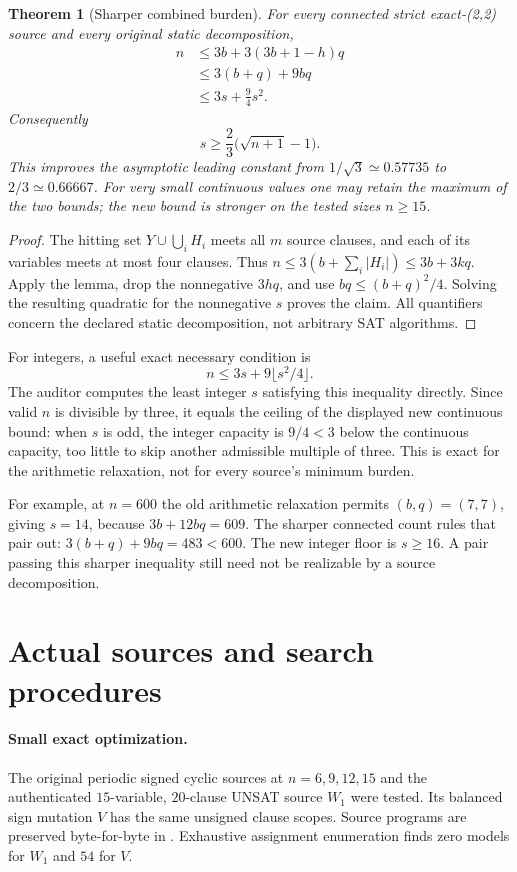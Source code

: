 \documentclass[11pt]{article}
\newtheorem{theorem}{Theorem}
\begin{document}
\begin{theorem}[Sharper combined burden]
For every connected strict exact-(2,2) source and every original static decomposition,
\begin{align*}
 n&\le3b+3(3b+1-h)q\\
  &\le3(b+q)+9bq\\
  &\le3s+\tfrac94s^2.
\end{align*}
Consequently
\[
 \boxed{s\ge\frac23\bigl(\sqrt{n+1}-1\bigr).}
\]
This improves the asymptotic leading constant from $1/\sqrt3\simeq0.57735$ to $2/3\simeq0.66667$. For very small continuous values one may retain the maximum of the two bounds; the new bound is stronger on the tested sizes $n\ge15$.
\end{theorem}
\begin{proof}
The hitting set $Y\cup\bigcup_iH_i$ meets all $m$ source clauses, and each of its variables meets at most four clauses. Thus $n\le3(b+\sum_i|H_i|)\le3b+3kq$. Apply the lemma, drop the nonnegative $3hq$, and use $bq\le(b+q)^2/4$. Solving the resulting quadratic for the nonnegative $s$ proves the claim. All quantifiers concern the declared static decomposition, not arbitrary SAT algorithms.
\end{proof}

For integers, a useful exact necessary condition is
\[
 n\le3s+9\lfloor s^2/4\rfloor.
\]
The auditor computes the least integer $s$ satisfying this inequality directly. Since valid $n$ is divisible by three, it equals the ceiling of the displayed new continuous bound: when $s$ is odd, the integer capacity is $9/4<3$ below the continuous capacity, too little to skip another admissible multiple of three. This is exact for the arithmetic relaxation, not for every source's minimum burden.

For example, at $n=600$ the old arithmetic relaxation permits $(b,q)=(7,7)$, giving $s=14$, because $3b+12bq=609$. The sharper connected count rules that pair out: $3(b+q)+9bq=483<600$. The new integer floor is $s\ge16$. A pair passing this sharper inequality still need not be realizable by a source decomposition.

\section{Actual sources and search procedures}
\paragraph{Small exact optimization.}
The original periodic signed cyclic sources at $n=6,9,12,15$ and the authenticated $15$-variable, $20$-clause UNSAT source $W_1$ were tested. Its balanced sign mutation $V$ has the same unsigned clause scopes. Source programs are preserved byte-for-byte in . Exhaustive assignment enumeration finds zero models for $W_1$ and $54$ for $V$.
\end{document}
